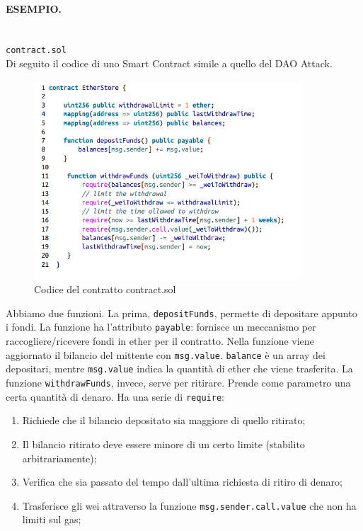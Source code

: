 \paragraph{ESEMPIO.}\ \\
\verb|contract.sol|\\
Di seguito il codice di uno Smart Contract simile a quello del DAO Attack.

\begin{figure}[H]
      \centering
      \includegraphics[width=10cm, keepaspectratio]{capitoli/ethereum/imgs/dao_buono.png}
      \caption{Codice del contratto contract.sol}
\end{figure}

Abbiamo due funzioni. La prima, \verb|depositFunds|, permette di depositare
appunto i fondi.
La funzione ha l'attributo \verb|payable|: fornisce un meccanismo per
raccogliere/ricevere fondi in ether per il contratto.
Nella funzione viene aggiornato il bilancio del mittente con \verb|msg.value|.
\verb|balance| è un array dei depositari, mentre \verb|msg.value| indica la
quantità di ether che viene trasferita.
La funzione \verb|withdrawFunds|, invece, serve per ritirare.
Prende come parametro una certa quantità di denaro.
Ha una serie di \verb|require|:

\begin{enumerate}
      \item Richiede che il bilancio depositato sia maggiore di quello ritirato;
      \item Il bilancio ritirato deve essere minore di un certo limite
            (stabilito arbitrariamente);
      \item Verifica che sia passato del tempo dall'ultima richiesta di ritiro di
            denaro;
      \item Trasferisce gli wei attraverso la funzione \verb|msg.sender.call.value|
            che non ha limiti sul gas;
\end{enumerate}

